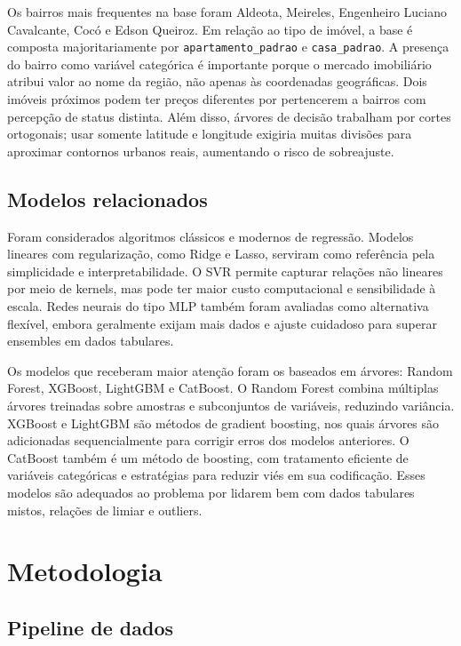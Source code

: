 \documentclass[12pt,a4paper]{article}
\begin{document}
Os bairros mais frequentes na base foram Aldeota, Meireles, Engenheiro Luciano Cavalcante, Cocó e Edson Queiroz. Em relação ao tipo de imóvel, a base é composta majoritariamente por \texttt{apartamento\_padrao} e \texttt{casa\_padrao}. A presença do bairro como variável categórica é importante porque o mercado imobiliário atribui valor ao nome da região, não apenas às coordenadas geográficas. Dois imóveis próximos podem ter preços diferentes por pertencerem a bairros com percepção de status distinta. Além disso, árvores de decisão trabalham por cortes ortogonais; usar somente latitude e longitude exigiria muitas divisões para aproximar contornos urbanos reais, aumentando o risco de sobreajuste.

\subsection{Modelos relacionados}

Foram considerados algoritmos clássicos e modernos de regressão. Modelos lineares com regularização, como Ridge e Lasso, serviram como referência pela simplicidade e interpretabilidade. O SVR permite capturar relações não lineares por meio de kernels, mas pode ter maior custo computacional e sensibilidade à escala. Redes neurais do tipo MLP também foram avaliadas como alternativa flexível, embora geralmente exijam mais dados e ajuste cuidadoso para superar ensembles em dados tabulares.

Os modelos que receberam maior atenção foram os baseados em árvores: Random Forest, XGBoost, LightGBM e CatBoost. O Random Forest combina múltiplas árvores treinadas sobre amostras e subconjuntos de variáveis, reduzindo variância. XGBoost e LightGBM são métodos de gradient boosting, nos quais árvores são adicionadas sequencialmente para corrigir erros dos modelos anteriores. O CatBoost também é um método de boosting, com tratamento eficiente de variáveis categóricas e estratégias para reduzir viés em sua codificação. Esses modelos são adequados ao problema por lidarem bem com dados tabulares mistos, relações de limiar e outliers.

\section{Metodologia}

\subsection{Pipeline de dados}
\end{document}
